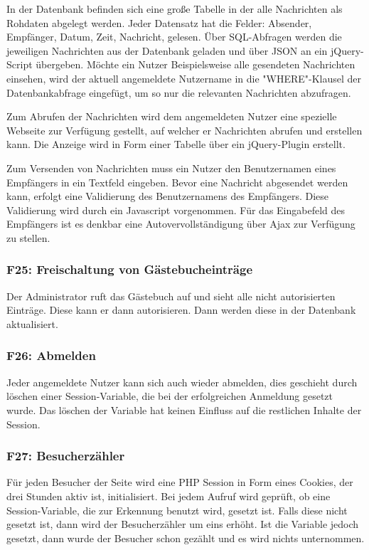\documentclass[10pt,a4paper]{scrartcl}
\begin{document}
In der Datenbank befinden sich eine große Tabelle in der alle Nachrichten als Rohdaten abgelegt werden.
Jeder Datensatz hat die Felder: Absender, Empfänger, Datum, Zeit, Nachricht, gelesen.
Über SQL-Abfragen werden die jeweiligen Nachrichten aus der Datenbank geladen und über JSON an ein
jQuery-Script übergeben. Möchte ein Nutzer Beispielsweise alle gesendeten Nachrichten einsehen, wird
der aktuell angemeldete Nutzername in die "WHERE"-Klausel der Datenbankabfrage eingefügt, um so nur 
die relevanten Nachrichten abzufragen.

Zum Abrufen der Nachrichten wird dem angemeldeten Nutzer eine spezielle Webseite zur Verfügung gestellt,
auf welcher er Nachrichten abrufen und erstellen kann. Die Anzeige wird in Form einer Tabelle über
ein jQuery-Plugin erstellt. 

Zum Versenden von Nachrichten muss ein Nutzer den Benutzernamen eines Empfängers in ein Textfeld eingeben.
Bevor eine Nachricht abgesendet werden kann, erfolgt eine Validierung des Benutzernamens des Empfängers.
Diese Validierung wird durch ein Javascript vorgenommen. 
Für das Eingabefeld des Empfängers ist es denkbar eine Autovervollständigung über Ajax zur Verfügung zu stellen. 

\subsubsection*{F25: Freischaltung von Gästebucheinträge}

Der Administrator ruft das Gästebuch auf und sieht alle nicht autorisierten Einträge. Diese kann er dann autorisieren. Dann werden diese in der Datenbank aktualisiert.

\subsubsection*{F26: Abmelden}

Jeder angemeldete Nutzer kann sich auch wieder abmelden, dies geschieht durch löschen einer Session-Variable, die bei der erfolgreichen Anmeldung gesetzt wurde. Das löschen der Variable hat keinen Einfluss auf die restlichen Inhalte der Session.

\subsubsection*{F27: Besucherzähler}

Für jeden Besucher der Seite wird eine PHP Session in Form eines Cookies, der drei Stunden aktiv ist, initialisiert. Bei jedem Aufruf wird geprüft, ob eine Session-Variable, die zur Erkennung benutzt wird, gesetzt ist. Falls diese nicht gesetzt ist, dann wird der Besucherzähler um eins erhöht. Ist die Variable jedoch gesetzt, dann wurde der Besucher schon gezählt und es wird nichts unternommen.
\end{document}
